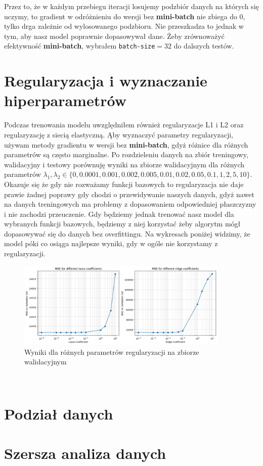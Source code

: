 \documentclass[polish,12pt,a4paper]{extarticle}
\begin{document}
Przez to, że w każdym przebiegu iteracji losujemy podzbiór danych na których się uczymy, to gradient w odróżnieniu do wersji bez \textbf{mini-batch} nie zbiega do 0, tylko drga zależnie od wylosowanego podzbioru. Nie przeszkadza to jednak w tym, aby nasz model poprawnie dopasowywał dane. Żeby zrównoważyć efektywność \textbf{mini-batch}, wybrałem \texttt{batch-size}$= 32$ do dalszych testów.

\FloatBarrier

\section*{Regularyzacja i wyznaczanie hiperparametrów}
Podczas trenowania modelu uwzględniłem również regularyzacje L1 i L2 oraz regularyzację z siecią elastyczną. Ąby wyznaczyć parametry regularyzacji, używam metody gradientu w wersji bez \textbf{mini-batch}, gdyż różnice dla różnych parametrów są często marginalne. Po rozdzieleniu danych na zbiór treningowy, walidacyjny i testowy porównuję wyniki na zbiorze walidacyjnym dla różnych parametrów $\lambda_1, \lambda_2 \in \{0, 0.0001, 0.001, 0.002, 0.005, 0.01, 0.02, 0.05, 0.1, 1, 2, 5, 10\}$. \bigskip \\
Okazuje się że gdy nie rozważamy funkcji bazowych to regularyzacja nie daje prawie żadnej poprawy gdy chodzi o przewidywanie naszych danych, gdyż nawet na danych treningowych ma problemy z dopasowaniem odpowiedniej płaszczyzny i nie zachodzi przeuczenie. Gdy będziemy jednak trenować nasz model dla wybranych funkcji bazowych, będziemy z niej korzystać żeby algorytm mógł dopasowywać się do danych bez overfittingu. Na wykresach poniżej widzimy, że model póki co osiąga najlepsze wyniki, gdy w ogóle nie korzystamy z regularyzacji.
\begin{figure}
    \centering
    \includegraphics[width=0.9\textwidth]{valid_reg_coef.png}
    \caption{Wyniki dla różnych parametrów regularyzacji na zbiorze walidacyjnym}
\end{figure} \\
\section*{Podział danych}

\section*{Szersza analiza danych}
\end{document}
